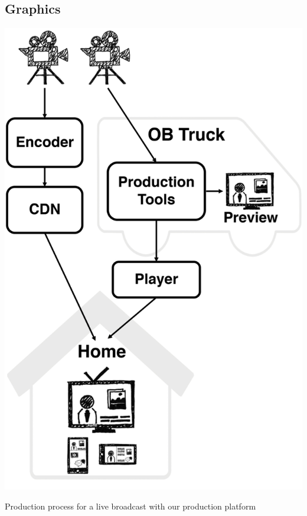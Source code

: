 \documentclass[sigchi-a, authorversion]{acmart}
\begin{document}

\subsection{Graphics}

\begin{marginfigure}
    \includegraphics[width=\marginparwidth]{Figures/process.png}
    \caption{Production process for a live broadcast with our production platform}
    \label{fig:process}
\end{marginfigure}
\end{document}
